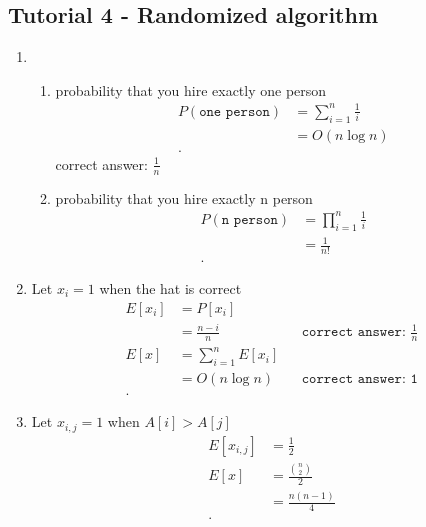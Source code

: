 \documentclass[../../main/main.tex]{subfiles}
\begin{document}
\subsection{Tutorial 4 - Randomized algorithm}
\begin{enumerate}
  \item \begin{enumerate}
    \item  probability that you hire exactly one person
      \begin{align*}
        P(\texttt{one person}) &= \sum^{n}_{i=1} \frac{1}{i} \\
        &= O(n\log n) \\
      .\end{align*}
      correct answer: $\frac{1}{n}$
    \item  probability that you hire exactly n person
      \begin{align*}
        P(\texttt{n person}) &= \prod^{n}_{i=1} \frac{1}{i} \\
        &= \frac{1}{n!} \\
      .\end{align*}
  \end{enumerate}
\item 
  Let $x_i=1$ when the hat is correct
  \begin{align*}
    E[x_i] &= P[x_i] \\ 
           &= \frac{n-i}{n} && \texttt{correct answer: $\frac{1}{n}$}\\
    E[x] &= \sum^{n}_{i=1} E[x_i] \\
         &= O(n \log n) && \texttt{correct answer: 1}\\
  .\end{align*}
\item 
  Let $x_{i,j}= 1$ when $A[i] > A[j]$
  \begin{align*}
    E[x_{i,j}] &= \frac{1}{2} \\
    E[x] &=  \frac{{n \choose 2}}{2} \\
    &= \frac{n(n-1)}{4} \\
  .\end{align*}


\end{enumerate}
\end{document}

